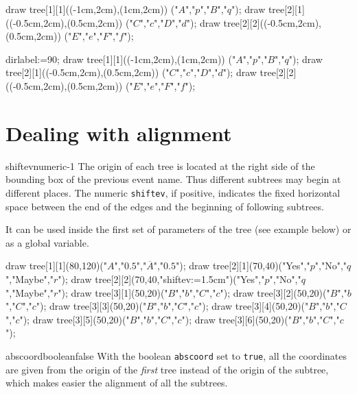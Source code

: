 \documentclass[11pt,a4paper,english]{article}
\begin{document}
\begin{exemple}[lefthand ratio=0.65]
draw tree[1][1]((-1cm,2cm),(1cm,2cm))
                              ("$A$","$p$","$B$","$q$");
draw tree[2][1]((-0.5cm,2cm),(0.5cm,2cm))
                              ("$C$","$c$","$D$","$d$");
draw tree[2][2]((-0.5cm,2cm),(0.5cm,2cm))
                              ("$E$","$e$","$F$","$f$");
\end{exemple}

\begin{exemple}[lefthand ratio=0.65]
dirlabel:=90;
draw tree[1][1]((-1cm,2cm),(1cm,2cm))
                              ("$A$","$p$","$B$","$q$");
draw tree[2][1]((-0.5cm,2cm),(0.5cm,2cm))
                              ("$C$","$c$","$D$","$d$");
draw tree[2][2]((-0.5cm,2cm),(0.5cm,2cm))
                              ("$E$","$e$","$F$","$f$");
\end{exemple}

\section{Dealing with alignment}

\begin{mptparam}{shiftev}{numeric}{-1}
The origin of each tree is located at the right side of the bounding box of the previous event name. Thus different subtrees may begin at different places. The numeric \verb|shiftev|, if positive, indicates the fixed horizontal space between the end of the edges and the beginning of following subtrees.

It can be used inside the first set of parameters of the tree (see example below) or as a global variable.
\end{mptparam}

\begin{exemple}
 draw tree[1][1](80,120)("$A$","$0.5$","$\overline{A}$","$0.5$");
 draw tree[2][1](70,40)("Yes","$p$","No","$q$","Maybe","$r$");
 draw tree[2][2](70,40,"shiftev:=1.5cm")("Yes","$p$","No","$q$","Maybe","$r$");
 draw tree[3][1](50,20)("$B$","$b$","$C$","$c$");
 draw tree[3][2](50,20)("$B$","$b$","$C$","$c$");
 draw tree[3][3](50,20)("$B$","$b$","$C$","$c$");
 draw tree[3][4](50,20)("$B$","$b$","$C$","$c$");
 draw tree[3][5](50,20)("$B$","$b$","$C$","$c$");
 draw tree[3][6](50,20)("$B$","$b$","$C$","$c$");
\end{exemple}

\begin{mptparam}{abscoord}{boolean}{false}
With the boolean \verb|abscoord| set to \verb|true|, all the coordinates are given from the origin of the \emph{first} tree instead of the origin of the subtree, which makes easier the alignment of all the subtrees.
\end{mptparam}
\end{document}
